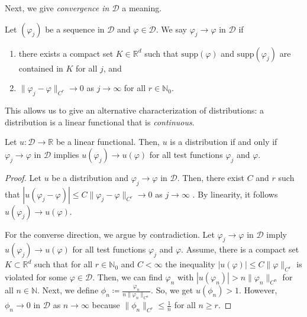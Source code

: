 Next, we give \emph{convergence in $\mathcal{D}$} a meaning.

\begin{definition}[Convergence]
    Let $(\varphi_j)$ be a sequence in $\mathcal{D}$ and $\varphi \in \mathcal{D}$. We say $
        \varphi_j \to \varphi  \text{ in $\mathcal{D}$}
    $
    if 
    \begin{enumerate}[label=(\roman*)]
        \item there exists a compact set $K \in \mathbb{R}^d$ such that $\mathrm{supp}(\varphi)$ and $\mathrm{supp}(\varphi_j)$ are contained in $K$ for all $j$, and 
        \item $\lVert \varphi_j - \varphi \rVert_{C^r} \to 0$ as $j \to \infty$ for all $r \in \mathbb{N}_0$.
    \end{enumerate} 
\end{definition}

This allows us to give an alternative characterization of distributions: a distribution is a linear functional that is \emph{continuous}.

\begin{lemma}
    Let $u: \mathcal{D} \to \mathbb{R}$ be a linear functional. Then, $u$ is a {distribution} if and only if $\varphi_j \to \varphi$ in $\mathcal{D}$ implies $u(\varphi_j) \to u(\varphi)$ for all test functions $\varphi_j$ and $\varphi$.
\end{lemma}

\begin{proof}
    Let $u$ be a distribution and $\varphi_j \to \varphi$ in $\mathcal{D}$. Then, there exist $C$ and $r$ such that $|u(\varphi_j -\varphi)| \leq C \lVert \varphi_j - \varphi \rVert_{C^r} \to 0$ as $j \to \infty$ . By linearity, it follows $u(\varphi_j) \to u(\varphi)$.

    For the converse direction, we argue by contradiction. Let $\varphi_j \to \varphi$ in $\mathcal{D}$ imply $u(\varphi_j) \to u(\varphi)$ for all test functions $\varphi_j$ and $\varphi$. Assume, there is a compact set $K \subset \mathbb{R}^d$ such that for all $r \in \mathbb{N}_0$ and $C < \infty$ the inequality $|u(\varphi)| \leq C \lVert\varphi\rVert_{C^r}$ is violated for some $\varphi \in \mathcal{D}$. Then, we can find $\varphi_n$ with $|u(\varphi_n)| > n \lVert \varphi_n \rVert_{C^n}$ for all $n \in \mathbb{N}$. Next, we define $\phi_n \coloneqq \frac{\varphi_n}{n \lVert \varphi_n \rVert_{C^n}}$. So, we get $u(\phi_n) > 1$. However, $\phi_n \to 0$ in $\mathcal{D}$ as $n \to \infty$ because $\lVert \phi_n \rVert_{C^r} \leq \frac{1}{n}$ for all $n \geq r$.
\end{proof}

